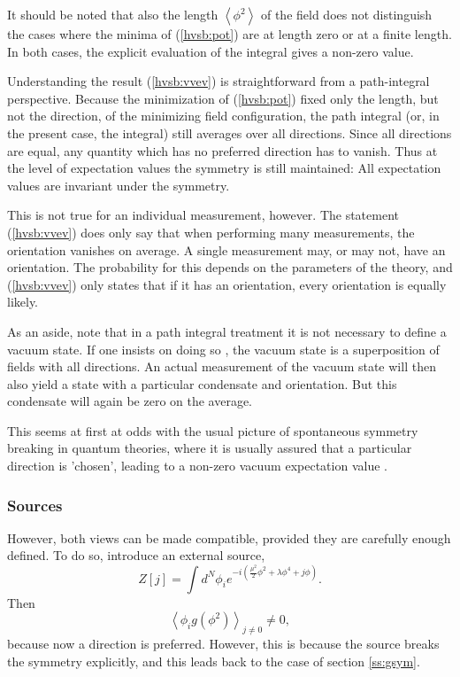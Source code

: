 \documentclass[final,12pt]{article}
\newcommand*{\no}{\noindent}
\newcommand*{\be}{\begin{equation}}
\newcommand*{\ee}{\end{equation}}
\newcommand*{\pref}[1]{(\ref{#1})}
\newcommand*{\nn}{\nonumber}
\newcommand*{\1}{1\!\!\!\bot}
\newcommand*{\la}{\left\langle}
\newcommand*{\ra}{\right\rangle}
\begin{document}
It should be noted that also the length $\la\phi^2\ra$ of the field does not distinguish the cases where the minima of \pref{hvsb:pot} are at length zero or at a finite length. In both cases, the explicit evaluation of the integral gives a non-zero value.

Understanding the result \pref{hvsb:vvev} is straightforward from a path-integral perspective. Because the minimization of \pref{hvsb:pot} fixed only the length, but not the direction, of the minimizing field configuration, the path integral (or, in the present case, the integral) still averages over all directions. Since all directions are equal, any quantity which has no preferred direction has to vanish. Thus at the level of expectation values the symmetry is still maintained: All expectation values are invariant under the symmetry.

This is not true for an individual measurement, however. The statement \pref{hvsb:vvev} does only say that when performing many measurements, the orientation vanishes on average. A single measurement may, or may not, have an orientation. The probability for this depends on the parameters of the theory, and \pref{hvsb:vvev} only states that if it has an orientation, every orientation is equally likely.

As an aside, note that in a path integral treatment it is not necessary to define a vacuum state. If one insists on doing so \cite{Weinberg:1996kr}, the vacuum state is a superposition of fields with all directions. An actual measurement of the vacuum state will then also yield a state with a particular condensate and orientation. But this condensate will again be zero on the average.

This seems at first at odds with the usual picture of spontaneous symmetry breaking in quantum theories, where it is usually assured that a particular direction is 'chosen', leading to a non-zero vacuum expectation value \cite{Bohm:2001yx}.

\subsubsection{Sources}

However, both views can be made compatible, provided they are carefully enough defined. To do so, introduce an external source,
\be
Z[j]=\int d^N\phi_i e^{-i\left(\frac{\mu^2}{2}\phi^2+\lambda\phi^4+j\phi\right)}\label{d0model}.
\ee
\no Then
\be
\la\phi_i g(\phi^2)\ra_{j\neq 0}\neq 0\nn,
\ee
\no because now a direction is preferred. However, this is because the source breaks the symmetry explicitly, and this leads back to the case of section \ref{ss:gsym}. 
\end{document}

